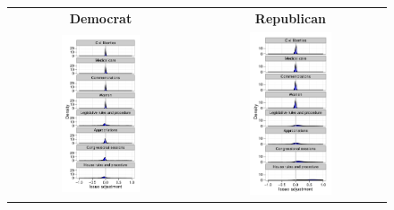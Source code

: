 \begin{figure}
  \center
  \begin{tabular}{cc}
    \Large \textbf{Democrat} & \Large \textbf{Republican} \normalsize \\
  \includegraphics[width=0.45\textwidth]{chapter_inferring_issue_preferences/figures/3393_issue_adjustment_density_democrats.pdf} &
  \includegraphics[width=0.45\textwidth]{chapter_inferring_issue_preferences/figures/3393_issue_adjustment_density_republicans.pdf} \\

\end{tabular}
\end{figure}
